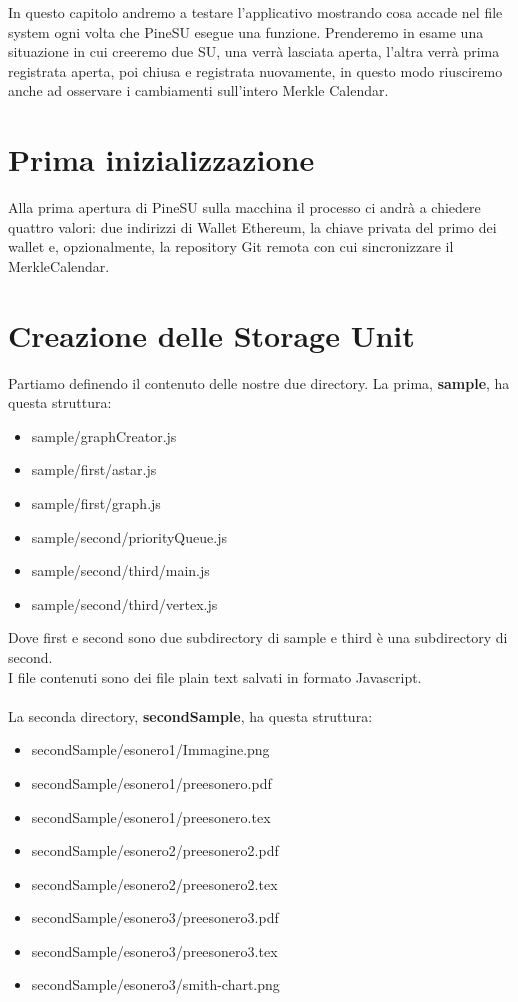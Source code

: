 In questo capitolo andremo a testare l'applicativo mostrando cosa accade nel
file system ogni volta che PineSU esegue una funzione.
Prenderemo in esame una situazione in cui creeremo due SU, una verrà lasciata aperta,
l'altra verrà prima registrata aperta, poi chiusa e registrata nuovamente, in questo modo
riusciremo anche ad osservare i cambiamenti sull'intero Merkle Calendar.

\section{Prima inizializzazione}

Alla prima apertura di PineSU sulla macchina il processo ci andrà a chiedere
quattro valori: due indirizzi di Wallet Ethereum, la chiave privata del primo dei wallet e,
opzionalmente, la repository Git remota con cui sincronizzare il MerkleCalendar.

\section{Creazione delle Storage Unit}

Partiamo definendo il contenuto delle nostre due directory. La prima,
\textbf{\textsf{sample}}, ha questa struttura:
\begin{itemize}
    \itemsep0em
    \item \textsf{sample/graphCreator.js}
    \item \textsf{sample/first/astar.js}
    \item \textsf{sample/first/graph.js}
    \item \textsf{sample/second/priorityQueue.js}
    \item \textsf{sample/second/third/main.js}
    \item \textsf{sample/second/third/vertex.js}
\end{itemize}
Dove \textsf{first} e \textsf{second} sono due subdirectory di \textsf{sample}
e \textsf{third} è una subdirectory di \textsf{second}. \\
I file contenuti sono dei file plain text salvati in formato Javascript. \\ \\
La seconda directory, \textbf{\textsf{secondSample}}, ha questa struttura:
\begin{itemize}
    \itemsep0em
    \item \textsf{secondSample/esonero1/Immagine.png}
    \item \textsf{secondSample/esonero1/preesonero.pdf}
    \item \textsf{secondSample/esonero1/preesonero.tex}
    \item \textsf{secondSample/esonero2/preesonero2.pdf}
    \item \textsf{secondSample/esonero2/preesonero2.tex}
    \item \textsf{secondSample/esonero3/preesonero3.pdf}
    \item \textsf{secondSample/esonero3/preesonero3.tex}
    \item \textsf{secondSample/esonero3/smith-chart.png}
\end{itemize}

